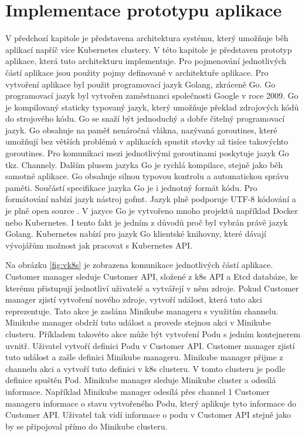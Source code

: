 \section{Implementace prototypu aplikace}
V předchozí kapitole je představena architektura systému, který umožňuje běh aplikací napříč více Kubernetes clustery. V této kapitole je představen prototyp aplikace, která tuto architekturu implementuje. Pro pojmenování jednotlivých částí aplikace jsou použity pojmy definované v architektuře aplikace. Pro vytvoření aplikace byl použit programovací jazyk Golang, zkráceně Go. Go programovací jazyk byl vytvořen zaměstnanci společnosti Google v roce 2009. Go je kompilovaný staticky typovaný jazyk, který umožňuje překlad zdrojových kódů do strojového kódu. Go se snaží být jednoduchý a dobře čitelný programovací jazyk. Go obsahuje na paměť nenáročná vlákna, nazývaná goroutines, které umožňují bez větších problémů v aplikacích spustit stovky až tisíce takovýchto goroutines. Pro komunikaci mezi jednotlivými goroutinami poskytuje jazyk Go tkz. Channely. Dalším plusem jazyka Go je rychlá kompilace, stejně jako běh samotné aplikace. Go obsahuje silnou typovou kontrolu a automatickou správu paměti. Součástí specifikace jazyka Go je i jednotný formát kódu. Pro formátování nabízí jazyk nástroj gofmt. Jazyk plně podporuje UTF-8 kódování a je plně open source \cite{miek}. V jazyce Go je vytvořeno mnoho projektů například Docker nebo Kubernetes. I tento fakt je jedním z důvodů proč byl vybrán právě jazyk Golang. Kubernetes nabízí pro jazyk Go klientské knihovny, které dávají vývojářům možnost jak pracovat s Kubernetes API.\par
    Na obrázku \ref{fig:vk8s} je zobrazena komunikace jednotlivých částí aplikace. Customer \linebreak manager sleduje Customer API, složené z k8s API a Etcd databáze, ke kterému přistupují jednotliví uživatelé a vytvářejí v něm zdroje. Pokud Customer manager zjistí vytvoření nového zdroje, vytvoří událost, která tuto akci reprezentuje. Tato akce je zaslána \linebreak Minikube manageru s využitím channelu. Minikube manager obdrží tuto událost a provede stejnou akci v Minikube clusteru. Příkladem takovéto akce může být vytvoření Podu s jedním kontejnerem uvnitř. Uživatel vytvoří definici Podu v Customer API. Customer manager zjistí tuto událost a zašle definici Minikube manageru. Minikube manager přijme z channelu akci a vytvoří tuto definici v k8s clusteru. V tomto clusteru je podle definice spuštěn Pod. Minikube manager sleduje Minikube cluster a odesílá informace. Například Minikube manager odesílá přes channel 1 Customer manageru informace o stavu vytvořeného Podu, který aplikuje tyto informace do Customer API. Uživatel tak vidí informace o podu v Customer API stejně jako by se připojoval přímo do Minikube clusteru.\par


